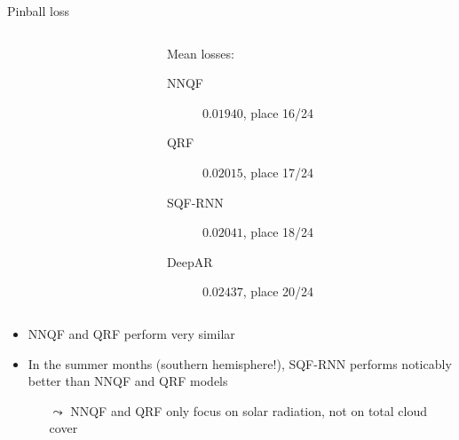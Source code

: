 \documentclass[10pt,aspectratio=169]{beamer}
\begin{document}
\begin{frame}[fragile]{Pinball loss}
    \begin{columns}
    \begin{column}{0.5\textwidth}
        \begin{flushright}
            
        \end{flushright}
    \end{column}
    \begin{column}{0.5\textwidth}
        Mean losses:
        \begin{description}
            \item[\textcolor{TolDarkBlue}{NNQF}] \(0.01940\), place 16/24
            \item[\textcolor{TolLightBrown}{QRF}] \(0.02015\), place 17/24
            \item[\textcolor{TolLightGreen}{SQF-RNN}] \(0.02041\), place 18/24
            \item[\textcolor{TolDarkBrown}{DeepAR}] \(0.02437\), place 20/24
        \end{description}
    \end{column}
    \end{columns}
    
    \begin{itemize}
        \item NNQF and QRF perform very similar
        \item In the summer months (southern hemisphere!), SQF-RNN performs noticably better than NNQF and QRF models
        \begin{itemize}
            \item[\(\leadsto\)] NNQF and QRF only focus on solar radiation, not on total cloud cover
        \end{itemize}
    \end{itemize}
\end{frame}
\end{document}
